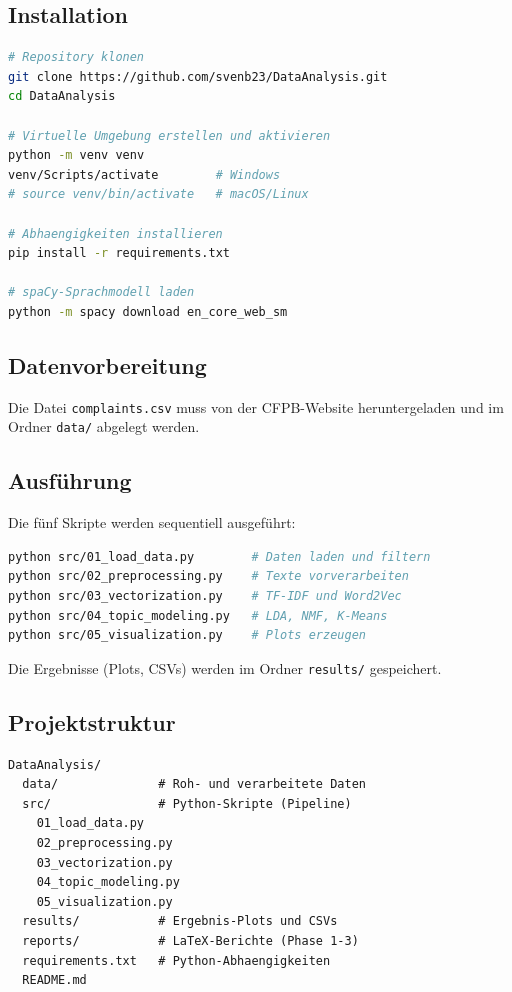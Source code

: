 \documentclass[a4paper,11pt]{article}
\begin{document}
\subsection{Installation}
\begin{lstlisting}[language=bash]
# Repository klonen
git clone https://github.com/svenb23/DataAnalysis.git
cd DataAnalysis

# Virtuelle Umgebung erstellen und aktivieren
python -m venv venv
venv/Scripts/activate        # Windows
# source venv/bin/activate   # macOS/Linux

# Abhaengigkeiten installieren
pip install -r requirements.txt

# spaCy-Sprachmodell laden
python -m spacy download en_core_web_sm
\end{lstlisting}

\subsection{Datenvorbereitung}
Die Datei \texttt{complaints.csv} muss von der CFPB-Website heruntergeladen und im Ordner
\texttt{data/} abgelegt werden.

\subsection{Ausführung}
Die fünf Skripte werden sequentiell ausgeführt:

\begin{lstlisting}[language=bash]
python src/01_load_data.py        # Daten laden und filtern
python src/02_preprocessing.py    # Texte vorverarbeiten
python src/03_vectorization.py    # TF-IDF und Word2Vec
python src/04_topic_modeling.py   # LDA, NMF, K-Means
python src/05_visualization.py    # Plots erzeugen
\end{lstlisting}

Die Ergebnisse (Plots, CSVs) werden im Ordner \texttt{results/} gespeichert.

\subsection{Projektstruktur}
\begin{lstlisting}
DataAnalysis/
  data/              # Roh- und verarbeitete Daten
  src/               # Python-Skripte (Pipeline)
    01_load_data.py
    02_preprocessing.py
    03_vectorization.py
    04_topic_modeling.py
    05_visualization.py
  results/           # Ergebnis-Plots und CSVs
  reports/           # LaTeX-Berichte (Phase 1-3)
  requirements.txt   # Python-Abhaengigkeiten
  README.md
\end{lstlisting}
\end{document}
